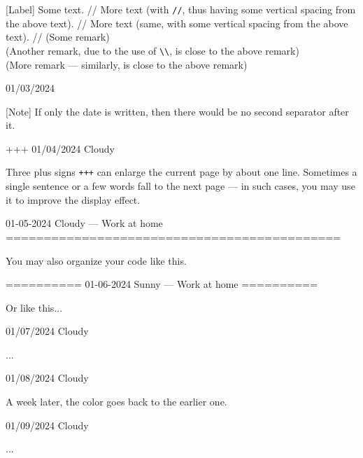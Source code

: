 \documentclass[11pt, paperstyle=light yellow, color entry, month-day-year,
  title in boldface, title in sffamily, use style = classical]{jwjournal}
\begin{document}
  [Label] Some text.
    //
    More text (with \texttt{\slash\slash}, thus having some vertical spacing from the above text).
    //
    More text (same, with some vertical spacing from the above text).
    //
    (Some remark)
    \\
    (Another remark, due to the use of \texttt{\textbackslash\textbackslash}, is close to the above remark)
    \\
    (More remark --- similarly, is close to the above remark)



01/03/2024

  [Note] If only the date is written, then there would be no second separator after it.


+++
01/04/2024  Cloudy

  Three plus signs \texttt{+++} can enlarge the current page by about one line. Sometimes a single sentence or a few words fall to the next page --- in such cases, you may use it to improve the display effect.



01-05-2024    Cloudy        --- Work at home
============================================

You may also organize your code like this.


==========
01-06-2024    Sunny         --- Work at home
==========

Or like this...



01/07/2024  Cloudy

  ...



01/08/2024  Cloudy

  A week later, the color goes back to the earlier one.



01/09/2024  Cloudy

  ...
\end{document}
